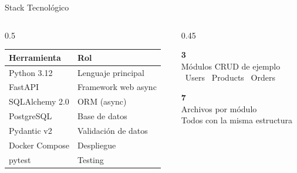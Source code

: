 \documentclass[aspectratio=169,11pt]{beamer}
\begin{document}
\begin{frame}{Stack Tecnol\'ogico}
  \begin{columns}[T]
    \begin{column}{0.5\textwidth}
      \begin{table}
        \centering
        \begin{tabular}{@{}ll@{}}
          \toprule
          \textcolor{ixtiTeal}{\textbf{Herramienta}} & \textcolor{ixtiTeal}{\textbf{Rol}} \\
          \midrule
          Python 3.12 & Lenguaje principal \\
          FastAPI & Framework web async \\
          SQLAlchemy 2.0 & ORM (async) \\
          PostgreSQL & Base de datos \\
          Pydantic v2 & Validaci\'on de datos \\
          Docker Compose & Despliegue \\
          pytest & Testing \\
          \bottomrule
        \end{tabular}
      \end{table}
    \end{column}
    \begin{column}{0.45\textwidth}
      \begin{statbox}
        \centering
        \textcolor{ixtiGreen!70!black}{\fontsize{26}{30}\selectfont\textbf{3}}\\[4pt]
        \textcolor{ixtiDark}{M\'odulos CRUD de ejemplo}\\[8pt]
        \small
        \textcolor{ixtiTeal}{\faUser\ Users} \quad
        \textcolor{ixtiTeal}{\faBox\ Products} \quad
        \textcolor{ixtiTeal}{\faShoppingCart\ Orders}
      \end{statbox}

      \vspace{0.3em}
      \begin{statbox}
        \centering
        \textcolor{ixtiGreen!70!black}{\fontsize{26}{30}\selectfont\textbf{7}}\\[4pt]
        \textcolor{ixtiDark}{Archivos por m\'odulo}\\[4pt]
        \small\textcolor{ixtiLightGray}{Todos con la misma estructura}
      \end{statbox}
    \end{column}
  \end{columns}
\end{frame}
\end{document}
